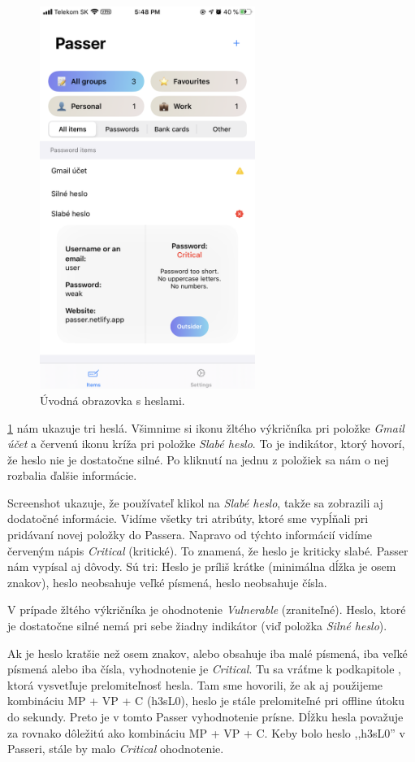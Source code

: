 \begin{figure}[H]
  \centering
  \includegraphics[width=7cm]{img/passer4.PNG}
  \caption{Úvodná obrazovka s heslami.}
  \label{passer4}
\end{figure}

\figurename{ \ref{passer4}} nám ukazuje tri heslá. Všimnime si ikonu žltého výkričníka pri položke \textit{Gmail účet} a červenú ikonu kríža pri položke \textit{Slabé heslo}. To je indikátor, ktorý hovorí, že heslo nie je dostatočne silné. Po kliknutí na jednu z položiek sa nám o nej rozbalia ďalšie informácie.

Screenshot ukazuje, že používateľ klikol na \textit{Slabé heslo}, takže sa zobrazili aj dodatočné informácie. Vidíme všetky tri atribúty, ktoré sme vypĺňali pri pridávaní novej položky do Passera. Napravo od týchto informácií vidíme červeným nápis \textit{Critical} (kritické). To znamená, že heslo je kriticky slabé. Passer nám vypísal aj dôvody. Sú tri: Heslo je príliš krátke (minimálna dĺžka je osem znakov), heslo neobsahuje veľké písmená, heslo neobsahuje čísla.

V prípade žltého výkričníka je ohodnotenie \textit{Vulnerable} (zraniteľné). Heslo, ktoré je dostatočne silné nemá pri sebe žiadny indikátor (viď položka \textit{Silné heslo}).

Ak je heslo kratšie než osem znakov, alebo obsahuje iba malé písmená, iba veľké písmená alebo iba čísla, vyhodnotenie je \textit{Critical}. Tu sa vráťme k podkapitole , ktorá vysvetľuje prelomiteľnosť hesla. Tam sme hovorili, že ak aj použijeme kombináciu MP + VP + C (h3sL0), heslo je stále prelomiteľné pri offline útoku do sekundy. Preto je v tomto Passer vyhodnotenie prísne. Dĺžku hesla považuje za rovnako dôležitú ako kombináciu MP + VP + C. Keby bolo heslo ,,h3sL0'' v Passeri, stále by malo \textit{Critical} ohodnotenie.

